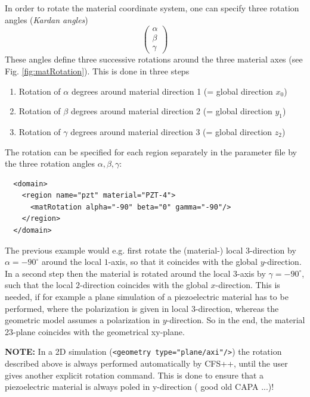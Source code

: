 In order to rotate the material coordinate system, one can specify three rotation angles (\emph{Kardan angles})
\begin{equation}
\left( 
 \begin{array}{c}
 \alpha \\ \beta \\ \gamma 
 \end{array}
\right)
\end{equation}
These angles define three successive rotations around the three material axes (see Fig. \ref{fig:matRotation}). This is done in three steps
\begin{enumerate}
 \item Rotation of $\alpha$ degrees around material direction 1 (= global direction $x_0$)
 \item Rotation of $\beta$ degrees around material direction 2 (= global direction $y_1$)
 \item Rotation of $\gamma$ degrees around material direction 3 (= global direction $z_2$)
\end{enumerate}
The rotation can be specified for each region separately in the parameter file by the three rotation angles $\alpha, \beta, \gamma$:
\begin{verbatim}
  <domain>
    <region name="pzt" material="PZT-4">
      <matRotation alpha="-90" beta="0" gamma="-90"/>
    </region>
  </domain>
\end{verbatim}
The previous example would e.g. first rotate the (material-) local $3$-direction by $\alpha=-90^\circ$ around the local $1$-axis, so that it coincides with the global $y$-direction. In a second step then the material is rotated around the local $3$-axis by $\gamma=-90^\circ$, such that the local $2$-direction coincides with the global $x$-direction. 
This is needed, if for example a plane simulation of a piezoelectric material has to be performed, where the polarization is given in local $3$-direction, whereas the geometric model assumes a polarization in $y$-direction. So in the end, the material 23-plane coincides with the geometrical xy-plane.
\newline

{\bf NOTE:} In a 2D simulation (\verb#<geometry type="plane/axi"/>#) the rotation described above is always performed automatically by CFS++, until the user gives another explicit rotation command. This is done to ensure that a piezoelectric material is always poled in y-direction ( good old CAPA ...)!
\newline

